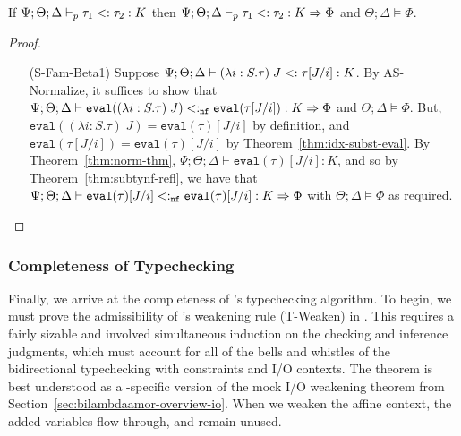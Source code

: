 \begin{theorem}
If $\Psi ; \Theta ; \Delta \vdash_p \tau_1 <: \tau_2 : K$ then  $\Psi ; \Theta ; \Delta \vdash_p \tau_1 <: \tau_2 : K \Rightarrow \Phi$ and $\Theta ; \Delta \vDash \Phi$.
\label{thm:subty-compl}
\end{theorem}
\begin{proof}
~\begin{itemize}
   \item[(S-Fam-Beta1)] Suppose $\Psi ; \Theta ; \Delta \vdash (\lambda i : S. \tau) \; J <: \tau[J/i] : K$. By AS-Normalize, it suffices to show that
   $\Psi ; \Theta ; \Delta \vdash \texttt{eval}((\lambda i : S. \tau) \; J) <:_{\texttt{nf}} \texttt{eval}(\tau[J/i]) : K \Rightarrow \Phi$ and $\Theta ; \Delta \vDash \Phi$.
   But, $\texttt{eval}((\lambda i : S. \tau) \; J) = \texttt{eval}(\tau)[J/i]$ by definition, and $\texttt{eval}(\tau[J/i]) = \texttt{eval}(\tau)[J/i]$ by Theorem~\ref{thm:idx-subst-eval}. By Theorem~\ref{thm:norm-thm},  $\Psi ; \Theta ; \Delta \vdash \texttt{eval}(\tau)[J/i] : K$, and so by Theorem~\ref{thm:subtynf-refl}, we have that $\Psi ; \Theta ; \Delta \vdash \texttt{eval}(\tau)[J/i] <:_{\texttt{nf}} \texttt{eval}(\tau)[J/i] : K \Rightarrow \Phi$ with $\Theta ; \Delta \vDash \Phi$ as required.
 \end{itemize}
\end{proof}

\subsubsection{Completeness of Typechecking}

Finally, we arrive at the completeness of \bilambdaamor's typechecking algorithm. To begin, we must prove the admissibility of \dlambdaamor's weakening rule (T-Weaken) in \bilambdaamor. This requires a fairly sizable and involved simultaneous induction on the checking and inference judgments, which must account for all of the bells and whistles of the bidirectional typechecking with constraints and I/O contexts. The theorem is best understood as a \bilambdaamor -specific version of the mock I/O weakening theorem from Section~\ref{sec:bilambdaamor-overview-io}. When we weaken the affine context, the added variables flow through, and remain unused.


